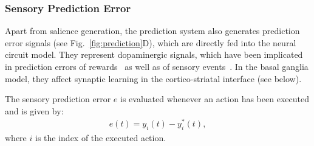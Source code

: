 \documentclass[a4paper]{scrreprt}
\begin{document}
\subsubsection{Sensory Prediction Error}

Apart from salience generation, the prediction system also generates prediction error signals (see Fig.~\ref{fig:prediction}D), which are directly fed into the neural circuit model. They represent dopaminergic signals, which have been implicated in prediction errors of rewards~\cite{schultz97} as well as of sensory events~\cite{redgrave08}. In the basal ganglia model, they affect synaptic learning in the cortico-striatal interface (see below).

The sensory prediction error $e$ is evaluated whenever an action has been executed and is given by:
\begin{align}
e(t) = y_i(t) - y^*_i(t),
\end{align}
where $i$ is the index of the executed action.


%
%
\end{document}
